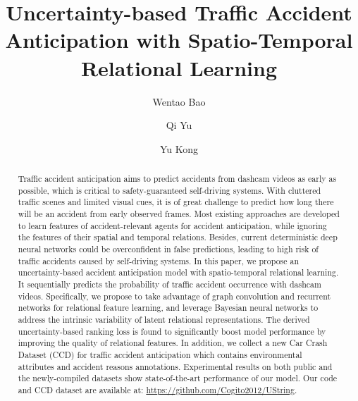 \documentclass[sigconf]{acmart}
\begin{document}
\fancyhead{}
\title{Uncertainty-based Traffic Accident Anticipation with Spatio-Temporal Relational Learning}

\author{Wentao Bao}

\author{Qi Yu}

\author{Yu Kong}

\def\etal{et~al.~}

\begin{abstract}
  Traffic accident anticipation aims to predict accidents from dashcam videos as early as possible, which is critical to safety-guaranteed self-driving systems. With cluttered traffic scenes and limited visual cues, it is of great challenge to predict how long there will be an accident from early observed frames. Most existing approaches are developed to learn features of accident-relevant agents for accident anticipation, while ignoring the features of their spatial and temporal relations. Besides, current deterministic deep neural networks could be overconfident in false predictions, leading to high risk of traffic accidents caused by self-driving systems. In this paper, we propose an uncertainty-based accident anticipation model with spatio-temporal relational learning. It sequentially predicts the probability of traffic accident occurrence with dashcam videos. Specifically, we propose to take advantage of graph convolution and recurrent networks for relational feature learning, and leverage Bayesian neural networks to address the intrinsic variability of latent relational representations. The derived uncertainty-based ranking loss is found to significantly boost model performance by improving the quality of relational features. In addition, we collect a new Car Crash Dataset (CCD) for traffic accident anticipation which contains environmental attributes and accident reasons annotations. Experimental results on both public and the newly-compiled datasets show state-of-the-art performance of our model. Our code and CCD dataset are available at: \href{https://github.com/Cogito2012/UString}{https://github.com/Cogito2012/UString}.
\end{abstract}
\end{document}
